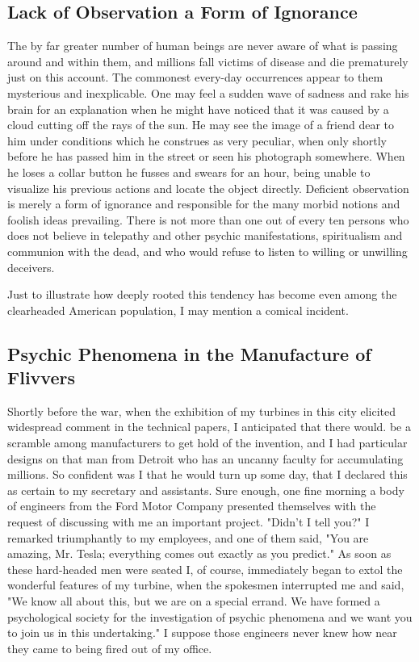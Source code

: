 \documentclass[a4paper,12pt,english,twoside,openright]{memoir}
\begin{document}
\subsection{Lack of Observation a Form of Ignorance}
The by far greater number of human beings are never aware of what is passing around and within 
them, and millions fall victims of disease and die prematurely just on this account.  The 
commonest every-day occurrences appear to them mysterious and inexplicable.  One may feel a 
sudden wave of sadness and rake his brain for an explanation when he might have noticed that it 
was caused by a cloud cutting off the rays of the sun.  He may see the image of a friend dear to 
him under conditions which he construes as very peculiar, when only shortly before he has 
passed him in the street or seen his photograph somewhere.  When he loses a collar button he 
fusses and swears for an hour, being unable to visualize his previous actions and locate the 
object directly.  Deficient observation is merely a form of ignorance and responsible for the many 
morbid notions and foolish ideas prevailing.  There is not more than one out of every ten persons 
who does not believe in telepathy and other psychic manifestations, spiritualism and communion 
with the dead, and who would refuse to listen to willing or unwilling deceivers.  

Just to illustrate how deeply rooted this tendency has become even among the clearheaded 
American population, I may mention a comical incident.  

\subsection{Psychic Phenomena in the Manufacture of Flivvers}
Shortly before the war, when the 
exhibition of my turbines in this city elicited widespread comment in the technical papers, I 
anticipated that there would.  be a scramble among manufacturers to get hold of the invention, 
and I had particular designs on that man from Detroit who has an uncanny faculty for 
accumulating millions.  So confident was I that he would turn up some day, that I declared this as 
certain to my secretary and assistants.  Sure enough, one fine morning a body of engineers from 
the Ford Motor Company presented themselves with the request of discussing with me an 
important project.  "Didn't I tell you?" I remarked triumphantly to my employees, and one of them 
said, "You are amazing, Mr. Tesla; everything comes out exactly as you predict." As soon as 
these hard-headed men were seated I, of course, immediately began to extol the wonderful 
features of my turbine, when the spokesmen interrupted me and said, "We know all about this, 
but we are on a special errand.  We have formed a psychological society for the investigation of 
psychic phenomena and we want you to join us in this undertaking." I suppose those engineers 
never knew how near they came to being fired out of my office.  
\end{document}
